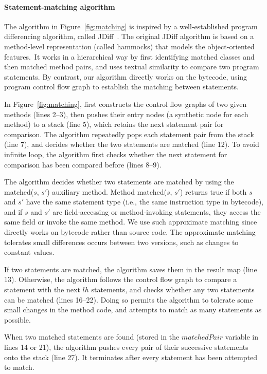 \paragraph{Statement-matching algorithm}

The algorithm in Figure~\ref{fig:matching} is inspired by
a well-established program differencing algorithm, called
JDiff~\cite{Apiwattanapong:2004}. The original JDiff
algorithm is based on a method-level representation
(called hammocks) that models the object-oriented features.\
It works in a hierarchical way by first identifying matched
classes and then matched method pairs, and uses
textual similarity to compare two program statements. By contrast, our
algorithm directly works on the bytecode, using program control flow graph
to establish the matching between statements.

In Figure~\ref{fig:matching}, \ourtool first constructs the control
flow graphs of two given methods (lines 2--3), then pushes their
entry nodes (a synthetic node for each method) to a stack (line 5), which retains
the next statement pair for comparison. The algorithm repeatedly
pops each statement pair from the stack (line 7), and
decides whether the two statements are matched (line 12).  To avoid infinite
loop, the algorithm first checks whether the next statement for comparison
has been compared before (lines 8--9). 

The algorithm decides whether two statements are matched by using
the matched($\mathit{s}$, $\mathit{s'}$) auxiliary method. Method
matched($\mathit{s}$, $\mathit{s'}$) returns true if both
$\mathit{s}$ and $\mathit{s'}$ have the same statement type (i.e.,
the same instruction type in bytecode), and if $\mathit{s}$ and
$\mathit{s'}$ are field-accessing or method-invoking statements,
they access the same field or invoke the same method.
We use such approximate matching since \ourtool directly works
on bytecode rather than source code. The approximate matching
tolerates small differences
occurs between two versions, such as changes to constant values.


If two statements are matched, the algorithm saves them in the
result map (line 13). Otherwise,
the algorithm follows the control flow graph to compare a statement with
the next $lh$ statements, and checks whether any two statements can be
matched (lines 16--22). Doing so permits the algorithm to tolerate some small
changes in the method code, and attempts to match as many statements as possible.

When two matched statements are found  (stored in
the $\mathit{matchedPair}$ variable in lines 14 or 21),
the algorithm pushes every pair of
their successive statements onto the stack (line 27).
It terminates after every statement has been attempted to match.



